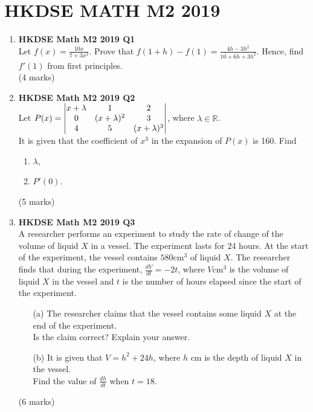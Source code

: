 \documentclass{report}
\begin{document}
\chapter{HKDSE MATH M2 2019}
\begin{enumerate}
	\item \textbf{HKDSE Math M2 2019 Q1}\\
	Let $\displaystyle f(x) = \frac{10x}{7+3x^2}$. Prove that $f(1+h) - f(1) = \displaystyle\frac{4h-3h^2}{10+6h+3h^2}$. Hence, find  $f'(1)$ from first principles. \\(4 marks)

	\item \textbf{HKDSE Math M2 2019 Q2}\\
	Let $P(x) = \begin{vmatrix}
		x+\lambda & 1 & 2  \\ 
		0 & (x+\lambda)^2 & 3 \\ 
		4 & 5 & (x+\lambda)^3  \notag
		\end{vmatrix}$, where $\lambda \in \mathbb{R}$. \\
	It is given that the coefficient of $x^3$ in the expansion of $P(x)$ is 160. Find
	\begin{enumerate}
		\item $\lambda$,
		\item $P'(0)$. 
	\end{enumerate}
	(5 marks)

	\item \textbf{HKDSE Math M2 2019 Q3}\\
	A researcher performs an experiment to study the rate of change of the volume of liquid $X$ in a vessel. The experiment lasts for $24$ hours. At the start  of the experiment, the vessel contains $580 $cm$^3$ of liquid $X$. The researcher finds that during the experiment, $\displaystyle\frac{dV}{dt} = -2t$, where $V $cm$^3$ is the volume of liquid $X$ in the vessel and $t$ is the number of hours elapsed since the start of the experiment.
	\begin{enumerate}
		\item [(a)] The researcher claims that the vessel contains some liquid $X$ at the end of the experiment. \\
		Is the claim correct? Explain your answer.
		\item [(b)] It is given that $V = h^2+24h$, where $h $ cm is the depth of liquid $X$ in the vessel. \\
		Find the value of $\displaystyle\frac{dh}{dt}$ when $t = 18$.
	\end{enumerate}
	(6 marks)


\end{enumerate}
\end{document}
